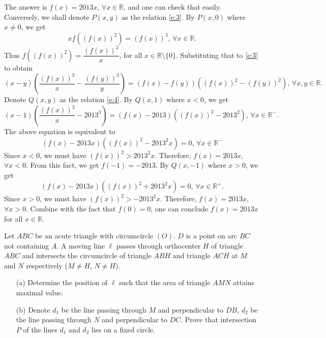\documentclass[11pt]{article}
\begin{document}
        \begin{solution}
            The answer is \(f(x) = 2013x\), \(\forall x \in \mathbb{R}\), and one can check that easily.\\
            Conversely, we shall denote \(P(x,y)\) as the relation \eqref{e:3}. By \(P(x,0)\) where \(x \neq 0\), we get
            \[x f\left(\left(f(x)\right)^2\right) = \left(f(x)\right)^3 \text{, } \forall x \in \mathbb{R}.\]
            Thus \(f\left(\left(f(x)\right)^2\right) = \dfrac{\left(f(x)\right)^3}{x}\), for all \(x \in \mathbb{R} \setminus \{0\}\). Substituting that to \eqref{e:3} to obtain
            \begin{equation}
                (x - y)\left(\frac{\left(f(x)\right)^3}{x} - \frac{\left(f(y)\right)^3}{y}\right) = \left(f(x) - f(y)\right)\left(\left(f(x)\right)^2 - \left(f(y)\right)^2\right) \text{, } \forall x,y \in \mathbb{R}.
                \label{e:4}
            \end{equation}
            Denote \(Q(x,y)\) as the relation \eqref{e:4}. By \(Q(x,1)\) where \(x < 0\), we get
            \[(x - 1)\left(\frac{\left(f(x)\right)^3}{x} - 2013^3\right) = (f(x) - 2013)\left(\left(f(x)\right)^2 - 2013^2\right) \text{, } \forall x \in \mathbb{R}^-.\]
            The above equation is equivalent to
            \[(f(x) - 2013x)\left(\left(f(x)\right)^2 - 2013^2x\right) = 0 \text{, } \forall x \in \mathbb{R}^-\]
            Since \(x < 0\), we must have \((f(x))^2 > 2013^2x\). Therefore, \(f(x) = 2013x\), \(\forall x < 0\). From this fact, we get \(f(-1) = -2013\). By \(Q(x,-1)\) where \(x > 0\), we get
            \[(f(x) - 2013x)\left(\left(f(x)\right)^2 + 2013^2x\right) = 0 \text{, } \forall x \in \mathbb{R}^+.\]
            Since \(x > 0\), we must have \((f(x))^2 > -2013^2x\). Therefore, \(f(x) = 2013x\), \(\forall x > 0\). Combine with the fact that \(f(0) = 0\), one can conclude \(f(x) = 2013x\) for all \(x \in \mathbb{R}\).
        \end{solution}

        \newpage

        \begin{problem}
            Let \(ABC\) be an acute triangle with circumcircle \((O)\). \(D\) is a point on arc \(BC\) not containing \(A\). A moving line \(\ell\) passes through orthocenter \(H\) of triangle \(ABC\) and intersects the circumcircle of triangle \(ABH\) and triangle \(ACH\) at \(M\) and \(N\) respectively (\(M \neq H\), \(N \neq H\)).
            \begin{enumerate}
                \item[(a)] Determine the position of \(\ell\) such that the area of triangle \(AMN\) attains maximal value.
                \item[(b)] Denote \(d_1\) be the line passing through \(M\) and perpendicular to \(DB\), \(d_2\) be the line passing through \(N\) and perpendicular to \(DC\). Prove that intersection \(P\) of the lines \(d_1\) and \(d_2\) lies on a fixed circle.
            \end{enumerate}
        \end{problem}
\end{document}
